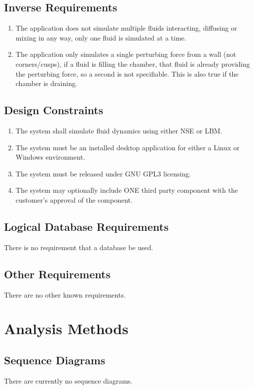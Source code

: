 \documentclass{scrartcl}
\begin{document}
\subsection{Inverse Requirements}
\begin{enumerate}
\item The application does not simulate multiple fluids interacting, diffusing or mixing in any way, only one fluid is simulated at a time.

\item The application only simulates a single perturbing force from a wall (not corners/cusps), if a fluid is filling the chamber, that fluid is already providing the perturbing force, so a second is not specifiable. This is also true if the chamber is draining.
\end{enumerate}
\subsection{Design Constraints}
\begin{enumerate}
\item The system shall simulate fluid dynamics using either NSE or LBM. 

\item The system must be an installed desktop application for either a Linux or Windows environment.
 
\item The system must be released under GNU GPL3 licensing.

\item The system may optionally include ONE third party component with the customer’s approval of the component. 

\end{enumerate}
\subsection{Logical Database Requirements}
There is no requirement that a database be used. 

\subsection{Other Requirements}
There are no other known requirements. 

\section{Analysis Methods}
\subsection{Sequence Diagrams}
There are currently no sequence diagrams.
\end{document}
